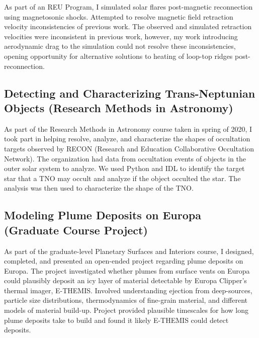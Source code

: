 \documentclass{article}
\begin{document}
As part of an REU Program, I simulated solar flares post-magnetic reconnection using magnetosonic shocks. Attempted to resolve magnetic field retraction velocity inconsistencies of previous work. The observed and simulated retraction velocities were inconsistent in previous work, however, my work introducing aerodynamic drag to the simulation could not resolve these inconsistencies, opening opportunity for alternative solutions to heating of loop-top ridges post-reconnection. 

\subsection{Detecting and Characterizing Trans-Neptunian Objects (Research Methods in Astronomy)}

As part of the Research Methods in Astronomy course taken in spring of 2020, I took part in helping resolve, analyze, and characterize the shapes of occultation targets observed by RECON (Research and Education Collaborative Occultation Network). The organization had data from occultation events of objects in the outer solar system to analyze. We used Python and IDL to identify the target star that a TNO may occult and analyze if the object occulted the star. The analysis was then used to characterize the shape of the TNO. 

\subsection{Modeling Plume Deposits on Europa (Graduate Course Project)}

As part of the graduate-level Planetary Surfaces and Interiors course, I designed, completed, and presented an open-ended project regarding plume deposits on Europa. The project investigated whether plumes from surface vents on Europa could plausibly deposit an icy layer of material detectable by Europa Clipper's thermal imager, E-THEMIS. Involved understanding ejection from deep-sources, particle size distributions, thermodynamics of fine-grain material, and different models of material build-up. Project provided plausible timescales for how long plume deposits take to build and found it likely E-THEMIS could detect deposits.
\end{document}
